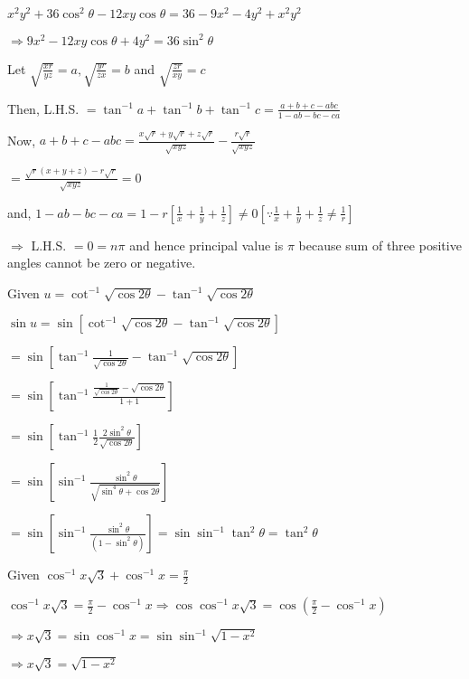   $x^2y^2 + 36\cos^2\theta - 12xy\cos\theta = 36 -9x^2 - 4y^2 + x^2y^2$

  $\Rightarrow 9x^2 - 12xy\cos\theta + 4y^2 = 36\sin^2\theta$

\item Let $\sqrt{\frac{xr}{yz}} = a, \sqrt{\frac{yr}{zx}} = b$ and $\sqrt{\frac{zr}{xy}} = c$


  Then, L.H.S. $= \tan^{-1}a + \tan^{-1}b + \tan^{-1}c = \frac{a + b + c- abc}{1 - ab - bc - ca}$

  Now, $a + b + c - abc = \frac{x\sqrt{r} + y\sqrt{r} + z\sqrt{r}}{\sqrt{xyz}} - \frac{r\sqrt{r}}{\sqrt{xyz}}$

  $= \frac{\sqrt{r}(x + y + z) - r\sqrt{r}}{\sqrt{xyz}} = 0$

  and, $1 - ab - bc - ca = 1- r\left[\frac{1}{x} + \frac{1}{y} + \frac{1}{z}\right]\neq 0[\because \frac{1}{x} +
    \frac{1}{y} + \frac{1}{z}\neq \frac{1}{r}]$

  $\Rightarrow$ L.H.S. $= 0 = n\pi$ and hence principal value is $\pi$ because sum of three positive angles
  cannot be zero or negative.

\item Given $u = \cot^{-1}\sqrt{\cos2\theta} - \tan^{-1}\sqrt{\cos2\theta}$

  $\sin u = \sin[\cot^{-1}\sqrt{\cos2\theta} - \tan^{-1}\sqrt{\cos2\theta}]$

  $= \sin\left[\tan^{-1}\frac{1}{\sqrt{\cos2\theta}} - \tan^{-1}\sqrt{\cos2\theta}\right]$

  $=\sin\left[\tan^{-1}\frac{\frac{1}{\sqrt{\cos2\theta}} - \sqrt{\cos2\theta}}{1 + 1}\right]$

  $=\sin\left[\tan^{-1}\frac{1}{2}\frac{2\sin^2\theta}{\sqrt{\cos2\theta}}\right]$

  $= \sin\left[\sin^{-1}\frac{\sin^2\theta}{\sqrt{\sin^4\theta + \cos2\theta}}\right]$

  $= \sin\left[\sin^{-1}\frac{\sin^2\theta}{(1 - \sin^2\theta)}\right] = \sin\sin^{-1}\tan^2\theta = \tan^2\theta$

\item Given $\cos^{-1}x\sqrt{3} + \cos^{-1}x = \frac{\pi}{2}$

  $\cos^{-1}x\sqrt{3} = \frac{\pi}{2} - \cos^{-1}x \Rightarrow \cos\cos^{-1}x\sqrt{3} = \cos\left(\frac{\pi}{2} -
  \cos^{-1}x\right)$

  $\Rightarrow x\sqrt{3} = \sin\cos^{-1}x = \sin\sin^{-1}\sqrt{1 - x^2}$

  $\Rightarrow x\sqrt{3} = \sqrt{1  - x^2}$

